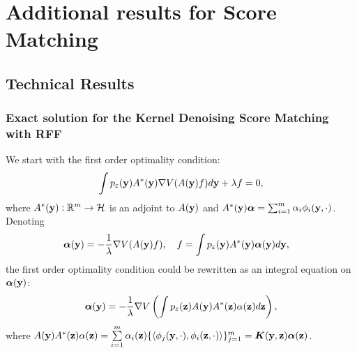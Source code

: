 \chapter{Additional results for Score Matching}

\section{Technical Results}
\label{chap:Technical}

\subsection{Exact solution for the Kernel Denoising Score Matching with RFF}
\label{sec:exact_solution}
We start with the first order optimality condition:
\begin{equation*}
    \int p_{\varepsilon}({\bf y}) A^*({\bf y})\nabla V(A({\bf y})f)d{\bf y} + \lambda f = 0,
\end{equation*}
where $A^*({\bf y}): \mathbb{R}^m \to \mathcal{H}$ is an adjoint to $A({\bf y})$ and
$A^*({\bf y}){\bm \alpha} = \sum_{i = 1}^m \alpha_i\phi_i({\bf y}, \cdot)$.
Denoting
\begin{align*}
    &{\bm \alpha}({\bf y}) = -\frac{1}{\lambda}\nabla V(A({\bf y})f),\quad f = \int p_{\varepsilon}({\bf y})A^*({\bf y}){\bm \alpha}({\bf y})d {\bf y},
\end{align*}
the first order optimality condition could be rewritten as an integral equation on
${\bm \alpha}({\bf y})$:
\begin{equation}
    {\bm \alpha}({\bf y}) = -\frac{1}{\lambda}\nabla V\left(\int p_{\varepsilon}({\bf z})A({\bf y})A^*({\bf z})\alpha({\bf z})d{\bf z}\right),
\end{equation}
where $A({\bf y})A^*({\bf z})\alpha({\bf z}) = \sum\limits_{i = 1}^m\alpha_i({\bf z})\{\langle \phi_j({\bf y}, \cdot),  \phi_i({\bf z}, \cdot)\rangle\}_{j = 1}^m = {\bm K}({\bf y}, {\bf z}){\bm \alpha}({\bf z})$.

